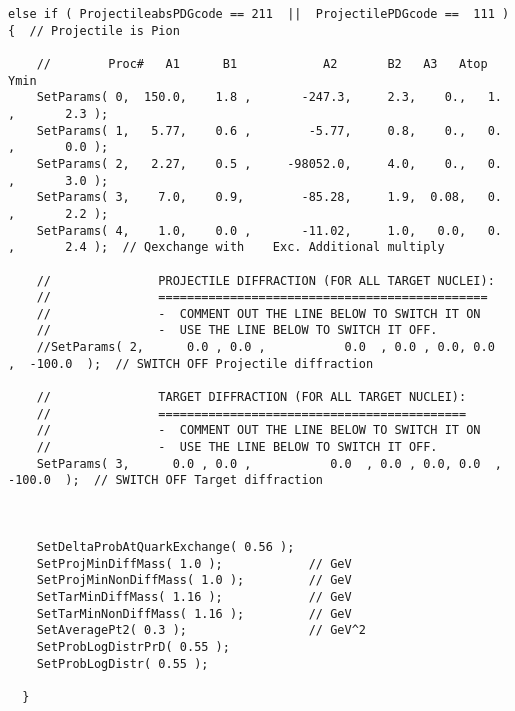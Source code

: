 \begin{lstlisting}
else if ( ProjectileabsPDGcode == 211  ||  ProjectilePDGcode ==  111 ) {  // Projectile is Pion 

    //        Proc#   A1      B1            A2       B2   A3   Atop       Ymin
    SetParams( 0,  150.0,    1.8 ,       -247.3,     2.3,    0.,   1. ,       2.3 );
    SetParams( 1,   5.77,    0.6 ,        -5.77,     0.8,    0.,   0. ,       0.0 );
    SetParams( 2,   2.27,    0.5 ,     -98052.0,     4.0,    0.,   0. ,       3.0 ); 
    SetParams( 3,    7.0,    0.9,        -85.28,     1.9,  0.08,   0. ,       2.2 );
    SetParams( 4,    1.0,    0.0 ,       -11.02,     1.0,   0.0,   0. ,       2.4 );  // Qexchange with    Exc. Additional multiply

    //               PROJECTILE DIFFRACTION (FOR ALL TARGET NUCLEI):
    //               ==============================================
    //               -  COMMENT OUT THE LINE BELOW TO SWITCH IT ON
    //               -  USE THE LINE BELOW TO SWITCH IT OFF.
    //SetParams( 2,      0.0 , 0.0 ,           0.0  , 0.0 , 0.0, 0.0  ,  -100.0  );  // SWITCH OFF Projectile diffraction

    //               TARGET DIFFRACTION (FOR ALL TARGET NUCLEI): 
    //               ===========================================
    //               -  COMMENT OUT THE LINE BELOW TO SWITCH IT ON
    //               -  USE THE LINE BELOW TO SWITCH IT OFF.
    SetParams( 3,      0.0 , 0.0 ,           0.0  , 0.0 , 0.0, 0.0  ,  -100.0  );  // SWITCH OFF Target diffraction



    SetDeltaProbAtQuarkExchange( 0.56 );
    SetProjMinDiffMass( 1.0 );            // GeV
    SetProjMinNonDiffMass( 1.0 );         // GeV 
    SetTarMinDiffMass( 1.16 );            // GeV
    SetTarMinNonDiffMass( 1.16 );         // GeV
    SetAveragePt2( 0.3 );                 // GeV^2
    SetProbLogDistrPrD( 0.55 );
    SetProbLogDistr( 0.55 );

  }

\end{lstlisting}

